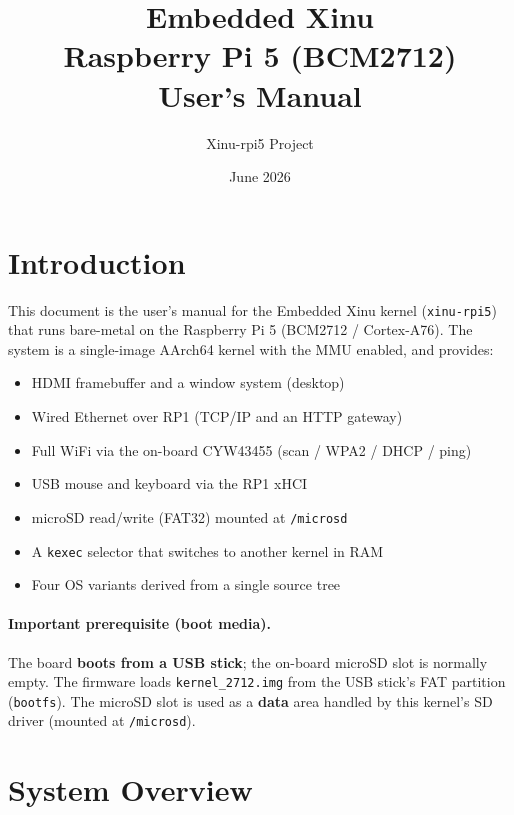 \documentclass[a4paper,11pt]{article}
\title{\textbf{Embedded Xinu\\ Raspberry Pi 5 (BCM2712) \\ User's Manual}}
\author{Xinu-rpi5 Project}
\date{June 2026}
\begin{document}
\maketitle
\tableofcontents
\newpage

\section{Introduction}
This document is the user's manual for the Embedded Xinu kernel
(\texttt{xinu-rpi5}) that runs bare-metal on the Raspberry Pi 5
(BCM2712 / Cortex-A76). The system is a single-image AArch64 kernel with
the MMU enabled, and provides:

\begin{itemize}[noitemsep]
  \item HDMI framebuffer and a window system (desktop)
  \item Wired Ethernet over RP1 (TCP/IP and an HTTP gateway)
  \item Full WiFi via the on-board CYW43455 (scan / WPA2 / DHCP / ping)
  \item USB mouse and keyboard via the RP1 xHCI
  \item microSD read/write (FAT32) mounted at \texttt{/microsd}
  \item A \texttt{kexec} selector that switches to another kernel in RAM
  \item Four OS variants derived from a single source tree
\end{itemize}

\paragraph{Important prerequisite (boot media).}
The board \textbf{boots from a USB stick}; the on-board microSD slot is
normally empty. The firmware loads \texttt{kernel\_2712.img} from the
USB stick's FAT partition (\texttt{bootfs}). The microSD slot is used as
a \textbf{data} area handled by this kernel's SD driver
(mounted at \texttt{/microsd}).

\section{System Overview}
\end{document}
